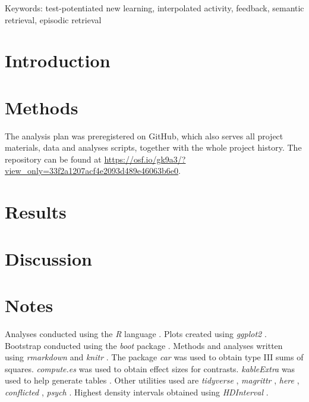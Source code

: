 \documentclass[12pt]{article}
\begin{document}
\bigskip

\noindent Keywords: test-potentiated new learning, interpolated activity, feedback,
semantic retrieval, episodic retrieval

\clearpage

\hypertarget{introduction}{%
\section{Introduction}}



\hypertarget{methods}{%
\section{Methods}}

The analysis plan was preregistered on GitHub, which also serves all project
materials, data and analyses scripts, together with the whole project history.
The repository can be found at \url{https://osf.io/gk9a3/?view_only=33f2a1207acf4e2093d489e46063b6e0}.



\hypertarget{results}{%
\section{Results}}



\hypertarget{discussion}{%
\section{Discussion}}



\section{Notes}

Analyses conducted using the \textit{R} language
\citep{rcoreteamLanguageEnvironmentStatistical2019}. Plots created using
\textit{ggplot2} \citep{wickhamGgplot2ElegantGraphics2016}. Bootstrap
conducted using the \textit{boot} package
\citep{cantyBootBootstrapSPlus2017}. Methods and analyses written using
\textit{rmarkdown} \citep{allaireRmarkdownDynamicDocuments2019} and
\textit{knitr} \citep{xieKnitrGeneralPurposePackage2019}. The package
\textit{car} \citep{foxCompanionAppliedRegression2011} was used to
obtain type III sums of squares. \textit{compute.es}
\citep{reComputeEsCompute2013} was used to obtain effect sizes for
contrasts. \textit{kableExtra} was used to help generate tables
\citep{zhuKableExtraConstructComplex2019}. Other utilities used are
\textit{tidyverse} \citep{wickhamTidyverseEasilyInstall2017},
\textit{magrittr} \citep{bacheMagrittrForwardPipeOperator2014},
\textit{here} \citep{mullerHereSimplerWay2017}, \textit{conflicted}
\citep{wickhamConflictedAlternativeConflict2018}, \textit{psych}
\citep{revellePsychProceduresPsychological2018}. Highest density
intervals obtained using \textit{HDInterval}
\citep{meredithHDIntervalHighestPosterior2018}.
\clearpage

{}


\end{document}
